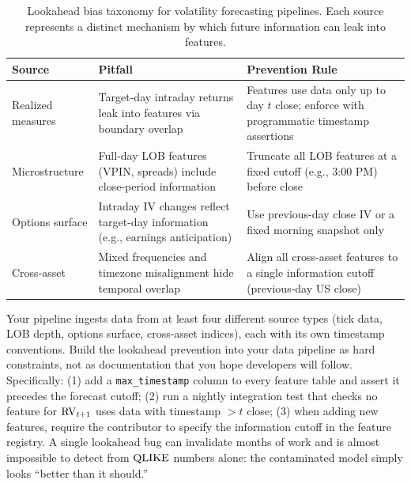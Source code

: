 \begin{table}[ht]
\centering
\caption{Lookahead bias taxonomy for volatility forecasting pipelines.
Each source represents a distinct mechanism by which future information can leak into features.}
\label{tab:lookahead-taxonomy}
\small
\begin{tabular}{@{}p{2.2cm}p{5.0cm}p{5.5cm}@{}}
\toprule
\textbf{Source} & \textbf{Pitfall} & \textbf{Prevention Rule} \\
\midrule
Realized measures
  & Target-day intraday returns leak into features via boundary overlap
  & Features use data only up to day $t$ close; enforce with programmatic timestamp assertions \\
\addlinespace
Microstructure
  & Full-day LOB features (VPIN, spreads) include close-period information
  & Truncate all LOB features at a fixed cutoff (e.g., 3:00 PM) before close \\
\addlinespace
Options surface
  & Intraday IV changes reflect target-day information (e.g., earnings anticipation)
  & Use previous-day close IV or a fixed morning snapshot only \\
\addlinespace
Cross-asset
  & Mixed frequencies and timezone misalignment hide temporal overlap
  & Align all cross-asset features to a single information cutoff (previous-day US close) \\
\bottomrule
\end{tabular}
\end{table}

\begin{projectconnection}
Your pipeline ingests data from at least four different source types (tick data, LOB depth, options surface, cross-asset indices), each with its own timestamp conventions.
Build the lookahead prevention into your data pipeline as hard constraints, not as documentation that you hope developers will follow.
Specifically:
(1) add a \texttt{max\_timestamp} column to every feature table and assert it precedes the forecast cutoff;
(2) run a nightly integration test that checks no feature for $\operatorname{RV}_{t+1}$ uses data with timestamp $> t$ close;
(3) when adding new features, require the contributor to specify the information cutoff in the feature registry.
A single lookahead bug can invalidate months of work and is almost impossible to detect from $\operatorname{QLIKE}$ numbers alone: the contaminated model simply looks ``better than it should.''
\end{projectconnection}


